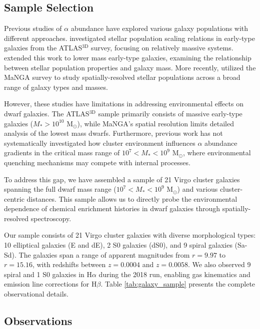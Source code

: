 \documentclass[linenumbers,trackchanges,twocolumn]{aastex631}
\begin{document}
\subsection{Sample Selection}

Previous studies of $\alpha$ abundance have explored various galaxy populations with different approaches. \citet{McDermid_2015} investigated stellar population scaling relations in early-type galaxies from the ATLAS$^{3\mathrm{D}}$ survey, focusing on relatively massive systems. \citet{Liu_2016} extended this work to lower mass early-type galaxies, examining the relationship between stellar population properties and galaxy mass. More recently, \citet{Zheng_2019} utilized the MaNGA survey to study spatially-resolved stellar populations across a broad range of galaxy types and masses. 

However, these studies have limitations in addressing environmental effects on dwarf galaxies. The ATLAS$^{3\mathrm{D}}$ sample primarily consists of massive early-type galaxies ($M_* > 10^{10}$ M$_{\odot}$), while MaNGA's spatial resolution limits detailed analysis of the lowest mass dwarfs. Furthermore, previous work has not systematically investigated how cluster environment influences $\alpha$ abundance gradients in the critical mass range of $10^7 < M_* < 10^9$ M$_{\odot}$, where environmental quenching mechanisms may compete with internal processes.

To address this gap, we have assembled a sample of 21 Virgo cluster galaxies spanning the full dwarf mass range ($10^7 < M_* < 10^9$ M$_{\odot}$) and various cluster-centric distances. This sample allows us to directly probe the environmental dependence of chemical enrichment histories in dwarf galaxies through spatially-resolved spectroscopy.



Our sample consists of 21 Virgo cluster galaxies with diverse morphological types: 10 elliptical galaxies (E and dE), 2 S0 galaxies (dS0), and 9 spiral galaxies (Sa-Sd). The galaxies span a range of apparent magnitudes from $r = 9.97$ to $r = 15.16$, with redshifts between $z = 0.0004$ and $z = 0.0058$. We also observed 9 spiral and 1 S0 galaxies in H$\alpha$ during the 2018 run, enabling gas kinematics and emission line corrections for H$\beta$. Table \ref{tab:galaxy_sample} presents the complete observational details.

\subsection{Observations}
\end{document}

